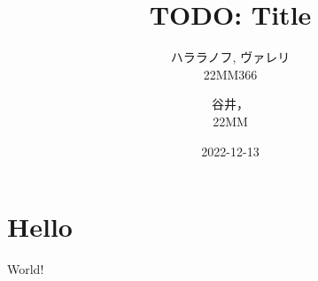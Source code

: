 \documentclass{jarticle}
\title{TODO: Title}
\author{
  ハララノフ, ヴァレリ\\
  \small{22MM366}
  \and
  谷井，\\
  \small{22MM}
}
\date{2022-12-13}
\begin{document}
    \maketitle
    \section{Hello}
    World!
\end{document}

